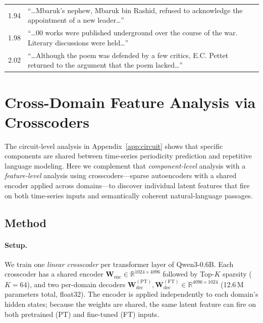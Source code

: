 \documentclass{article}
\begin{document}
\begin{table}[h]
\begin{tabularx}{\textwidth}{r >{\raggedright\arraybackslash}X}
1.94 & ``\ldots Mbaruk's nephew, Mbaruk bin Rashid, refused to acknowledge the appointment of a new leader\ldots'' \\
1.98 & ``\ldots 00 works were published underground over the course of the war. Literary discussions were held\ldots'' \\
2.02 & ``\ldots Although the poem was defended by a few critics, E.C. Pettet returned to the argument that the poem lacked\ldots'' \\
\bottomrule
\end{tabularx}
\end{table}


\newpage
\section{Cross-Domain Feature Analysis via Crosscoders}
\label{app:crosscoder}

The circuit-level analysis in Appendix~\ref{app:circuit} shows that specific components are shared between time-series periodicity prediction and repetitive language modeling. Here we complement that \emph{component-level} analysis with a \emph{feature-level} analysis using crosscoders---sparse autoencoders with a shared encoder applied across domains---to discover individual latent features that fire on both time-series inputs and semantically coherent natural-language passages.

\subsection{Method}
\label{app:crosscoder_method}

\paragraph{Setup.}
We train one \emph{linear crosscoder} per transformer layer of Qwen3-0.6B.  Each crosscoder has a shared encoder $\mathbf{W}_{\mathrm{enc}} \in \mathbb{R}^{1024 \times 4096}$ followed by Top-$K$ sparsity ($K{=}64$), and two per-domain decoders $\mathbf{W}_{\mathrm{dec}}^{(\mathrm{PT})}, \mathbf{W}_{\mathrm{dec}}^{(\mathrm{FT})} \in \mathbb{R}^{4096 \times 1024}$ (12.6\,M parameters total, float32).  The encoder is applied independently to each domain's hidden states; because the weights are shared, the same latent feature can fire on both pretrained (PT) and fine-tuned (FT) inputs.
\end{document}
